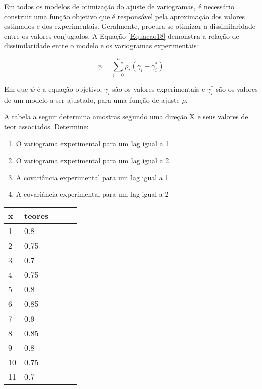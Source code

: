 Em todos os modelos de otimização do ajuste de variogramas, é necessário construir uma função objetivo que é responsável pela aproximação dos valores estimados e dos experimentais. Geralmente, procura-se otimizar a dissimilaridade entre os valores conjugados. A Equação \ref{Equacao18} demonstra a relação de dissimilaridade entre o modelo e os variogramas experimentais:

\begin{equation}\label{Equacao18}
\psi = \sum_{i=0}^{n}\rho_i(\gamma_i - \gamma_i^*)
\end{equation}

Em que $\psi$ é a equação objetivo, $\gamma_i$ são os valores experimentais e  $\gamma_i^*$ são os valores de um modelo a ser ajustado, para uma função de ajuste $\rho$.

\begin{exercise}
	A tabela a seguir determina amostras segundo uma direção X e seus valores de teor associados. Determine:\\
	
	\begin{enumerate}
	 \item O variograma experimental para um lag igual a 1\\
	 \item O variograma experimental para um lag igual a 2\\
	 \item A covariância experimental para um lag igual a 1\\
	 \item A covariância experimental para um lag igual a 2\\ 
	\end{enumerate}
	
	\begin{tabular}{lllll}
		\hline
		x  & teores &  &  &  \\ \hline
		1  & 0.8    &  &  &  \\
		2  & 0.75   &  &  &  \\
		3  & 0.7    &  &  &  \\
		4  & 0.75   &  &  &  \\
		5  & 0.8    &  &  &  \\
		6  & 0.85   &  &  &  \\
		7  & 0.9    &  &  &  \\
		8  & 0.85   &  &  &  \\
		9  & 0.8    &  &  &  \\
		10 & 0.75   &  &  &  \\
		11 & 0.7    &  &  &  \\ \hline
	\end{tabular}
	
\end{exercise}

